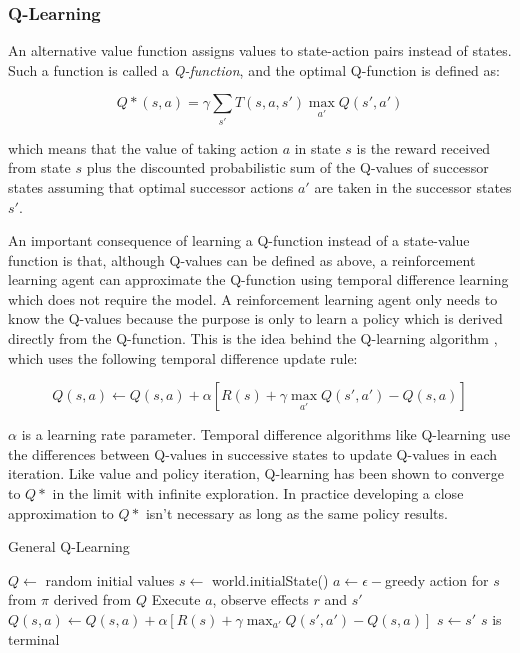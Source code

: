 \subsubsection{Q-Learning}

An alternative value function assigns values to state-action pairs instead of states. Such a function is called a {\it Q-function}, and the optimal Q-function is defined as:

\begin{equation}
Q*(s, a) = \gamma \sum_{s'} T(s, a, s') \max_{a'} Q(s', a')
\end{equation}

which means that the value of taking action $a$ in state $s$ is the reward received from state $s$ plus the discounted probabilistic sum of the Q-values of successor states assuming that optimal successor actions $a'$ are taken in the successor states $s'$.

An important consequence of learning a Q-function instead of a state-value function is that, although Q-values can be defined as above, a reinforcement learning agent can approximate the Q-function using temporal difference learning which does not require the model. A reinforcement learning agent only needs to know the Q-values because the purpose is only to learn a policy which is derived directly from the Q-function. This is the idea behind the Q-learning algorithm \cite{watkins1989models}, which uses the following temporal difference update rule:

\begin{equation}\label{eqn:q-update}
Q(s, a) \leftarrow Q(s, a) + \alpha [R(s) + \gamma \max_{a'} Q(s', a') - Q(s, a)]
\end{equation}

$\alpha$ is a learning rate parameter. Temporal difference algorithms like Q-learning use the differences between Q-values in successive states to update Q-values in each iteration. Like value and policy iteration, Q-learning has been shown to converge to $Q*$ in the limit with infinite exploration. In practice developing a close approximation to $Q*$ isn't necessary as long as the same policy results.

\begin{algorithm}
  \caption{General Q-Learning}\label{alg:q-learning}
  \begin{algorithmic}
    \State $Q \gets$ random initial values
      \State $s \gets$ world.initialState()
      \Repeat
        \State $a \gets \epsilon-$greedy action for $s$ from $\pi$ derived from $Q$
        \State Execute $a$, observe effects $r$ and $s'$
        \State $Q(s, a) \gets Q(s, a) + \alpha [R(s) + \gamma \max_{a'} Q(s', a') - Q(s, a)]$
        \State $s \gets s'$
      \Until $s$ is terminal
    \EndFor
  \end{algorithmic}
\end{algorithm}



